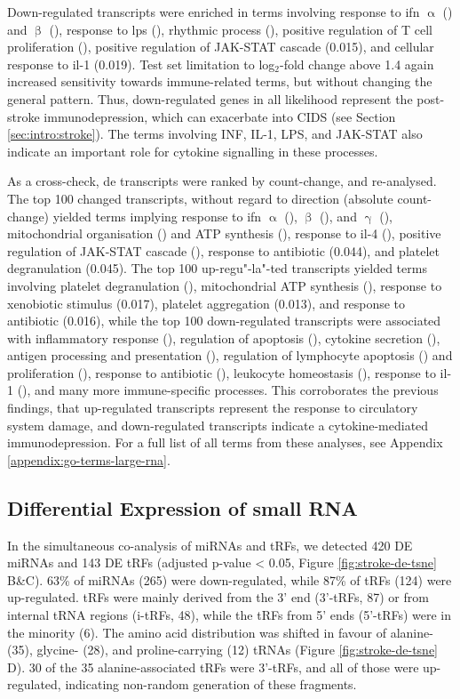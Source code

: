 Down-regulated transcripts were enriched in terms involving response to \ac{ifn} $\upalpha$ () and $\upbeta$ (), response to \ac{lps} (), rhythmic process (), positive regulation of T cell proliferation (), positive regulation of JAK-STAT cascade (0.015), and cellular response to \ac{il}-1 (0.019). Test set limitation to log$_2$-fold change above 1.4 again increased sensitivity towards immune-related terms, but without changing the general pattern. Thus, down-regulated genes in all likelihood represent the post-stroke immunodepression, which can exacerbate into CIDS (see Section \ref{sec:intro:stroke}). The terms involving INF, IL-1, LPS, and JAK-STAT also indicate an important role for cytokine signalling in these processes.

As a cross-check, \ac{de} transcripts were ranked by count-change, and re-analysed. The top 100 changed transcripts, without regard to direction (absolute count-change) yielded terms implying response to \ac{ifn} $\upalpha$ (), $\upbeta$ (), and $\upgamma$ (), mitochondrial organisation () and ATP synthesis (), response to \ac{il}-4 (), positive regulation of JAK-STAT cascade (), response to antibiotic (0.044), and platelet degranulation (0.045). The top 100 up-regu"-la"-ted transcripts yielded terms involving platelet degranulation (), mitochondrial ATP synthesis (), response to xenobiotic stimulus (0.017), platelet aggregation (0.013), and response to antibiotic (0.016), while the top 100 down-regulated transcripts were associated with inflammatory response (), regulation of apoptosis (), cytokine secretion (), antigen processing and presentation (), regulation of lymphocyte apoptosis () and proliferation (), response to antibiotic (), leukocyte homeostasis (), response to \ac{il}-1 (), and many more immune-specific processes. This corroborates the previous findings, that up-regulated transcripts represent the response to circulatory system damage, and down-regulated transcripts indicate a cytokine-mediated immunodepression. For a full list of all terms from these analyses, see Appendix \ref{appendix:go-terms-large-rna}. 

\subsection{Differential Expression of small RNA}
In the simultaneous co-analysis of miRNAs and tRFs, we detected 420 DE miRNAs and 143 DE tRFs (adjusted p-value < 0.05, Figure \ref{fig:stroke-de-tsne}\,B\&C). 63\% of miRNAs (265) were down-regulated, while 87\% of tRFs (124) were up-regulated. tRFs were mainly derived from the 3' end (3'-tRFs, 87) or from internal tRNA regions (i-tRFs, 48), while the tRFs from 5' ends (5'-tRFs) were in the minority (6). The amino acid distribution was shifted in favour of alanine- (35), glycine- (28), and proline-carrying (12) tRNAs (Figure \ref{fig:stroke-de-tsne}\,D). 30 of the 35 alanine-associated tRFs were 3'-tRFs, and all of those were up-regulated, indicating non-random generation of these fragments.

